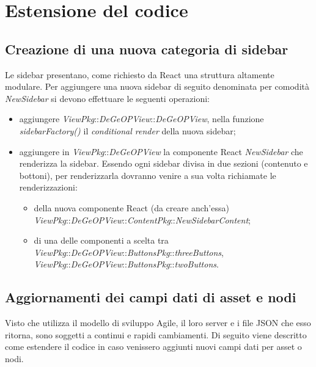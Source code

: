 \newpage

\section{Estensione del codice}

\subsection{Creazione di una nuova categoria di sidebar}
Le sidebar presentano, come richiesto da React una struttura altamente modulare.
Per aggiungere una nuova sidebar di seguito denominata per comodità \textit{NewSidebar} si devono effettuare le seguenti operazioni:
\begin{itemize}
	\item aggiungere \textit{ViewPkg}::\textit{DeGeOPView}::\textit{DeGeOPView}, nella funzione \textit{sidebarFactory()} il \textit{conditional render} della nuova sidebar;
	\item aggiungere in \textit{ViewPkg}::\textit{DeGeOPView} la componente React  \textit{NewSidebar} che renderizza la sidebar. Essendo ogni sidebar divisa in due sezioni (contenuto e bottoni), per renderizzarla dovranno venire a sua volta richiamate le renderizzazioni:
	\begin{itemize}
		\item della nuova componente React (da creare anch'essa) \textit{ViewPkg}::\textit{DeGeOPView}::\textit{ContentPkg}::\textit{NewSidebarContent};
		\item di una delle componenti a scelta tra \textit{ViewPkg}::\textit{DeGeOPView}::\textit{ButtonsPkg}::\textit{threeButtons}, \textit{ViewPkg}::\textit{DeGeOPView}::\textit{ButtonsPkg}::\textit{twoButtons}.
	\end{itemize}
\end{itemize}

\subsection{Aggiornamenti dei campi dati di asset e nodi}
Visto che \riskapp{} utilizza il modello di sviluppo Agile, il loro server e i file JSON che esso ritorna, sono soggetti a continui e rapidi cambiamenti. Di seguito viene descritto come estendere il codice in caso venissero aggiunti nuovi campi dati per asset o nodi.

